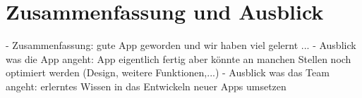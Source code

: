 \chapter{Zusammenfassung und Ausblick}
\label{cha:zusammenfassungUndAusblick}

- Zusammenfassung: gute App geworden und wir haben viel gelernt ...
- Ausblick was die App angeht: App eigentlich fertig aber könnte an manchen Stellen noch optimiert werden (Design, weitere Funktionen,...)
- Ausblick was das Team angeht: erlerntes Wissen in das Entwickeln neuer Apps umsetzen